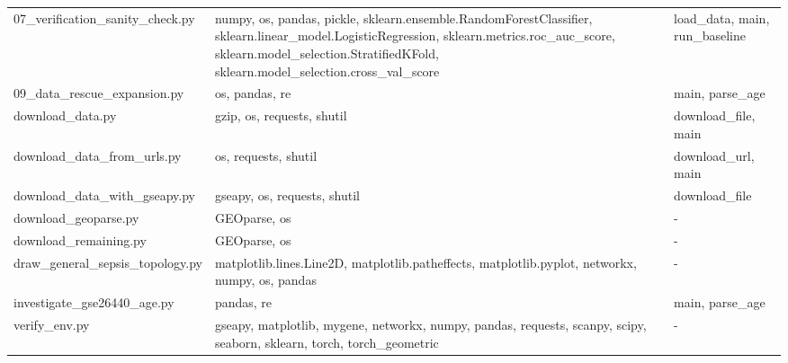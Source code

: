\documentclass[11pt]{article}
\begin{document}
\begin{longtable}{p{}p{}p{}}
07\_verification\_sanity\_check.py & numpy, os, pandas, pickle, sklearn.ensemble.RandomForestClassifier, sklearn.linear\_model.LogisticRegression, sklearn.metrics.roc\_auc\_score, sklearn.model\_selection.StratifiedKFold, sklearn.model\_selection.cross\_val\_score & load\_data, main, run\_baseline \\
09\_data\_rescue\_expansion.py & os, pandas, re & main, parse\_age \\
download\_data.py & gzip, os, requests, shutil & download\_file, main \\
download\_data\_from\_urls.py & os, requests, shutil & download\_url, main \\
download\_data\_with\_gseapy.py & gseapy, os, requests, shutil & download\_file \\
download\_geoparse.py & GEOparse, os & - \\
download\_remaining.py & GEOparse, os & - \\
draw\_general\_sepsis\_topology.py & matplotlib.lines.Line2D, matplotlib.patheffects, matplotlib.pyplot, networkx, numpy, os, pandas & - \\
investigate\_gse26440\_age.py & pandas, re & main, parse\_age \\
verify\_env.py & gseapy, matplotlib, mygene, networkx, numpy, pandas, requests, scanpy, scipy, seaborn, sklearn, torch, torch\_geometric & - \\
\end{longtable}
\end{document}
